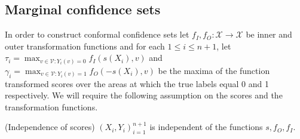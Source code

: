 \subsection{Marginal confidence sets}\label{SS:MCS}
In order to construct conformal confidence sets let $f_I, f_O:\mathcal{X} \rightarrow \mathcal{X}$ be inner and outer transformation functions and for each $1\leq i \leq n +1 $, let $\tau_i = \max_{v \in \mathcal{V}: Y_i(v) = 0} f_I(s(X_i), v)$ and $\gamma_i = \max_{v \in \mathcal{V}: Y_i(v) = 1} f_O(-s(X_i), v)$  be the maxima of the function transformed scores over the areas at which the true labels equal 0 and 1 respectively. We will require the following assumption on the scores and the transformation functions.
\begin{assumption}\label{ass:indep}
	(Independence of scores) $(X_i, Y_i)_{i = 1}^{n+1}$ is independent of the functions $s, f_O, f_I$. 
\end{assumption}

